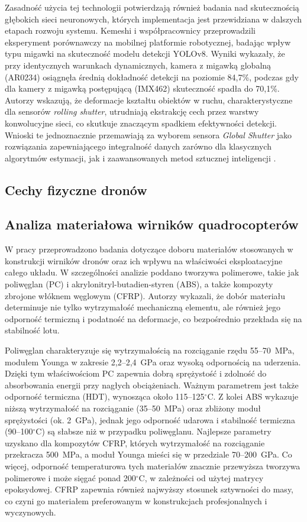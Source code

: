 \documentclass[a4paper,twoside,12pt]{book}
\begin{document}
Zasadność użycia tej technologii potwierdzają również badania nad skutecznością głębokich sieci neuronowych, których implementacja jest przewidziana w dalszych etapach rozwoju systemu. Kemeshi i współpracownicy przeprowadzili eksperyment porównawczy na mobilnej platformie robotycznej, badając wpływ typu migawki na skuteczność modelu detekcji YOLOv8. Wyniki wykazały, że przy identycznych warunkach dynamicznych, kamera z migawką globalną (AR0234) osiągnęła średnią dokładność detekcji na poziomie 84,7\%, podczas gdy dla kamery z migawką postępującą (IMX462) skuteczność spadła do 70,1\%. Autorzy wskazują, że deformacje kształtu obiektów w ruchu, charakterystyczne dla sensorów \textit{rolling shutter}, utrudniają ekstrakcję cech przez warstwy konwolucyjne sieci, co skutkuje znaczącym spadkiem efektywności detekcji. Wnioski te jednoznacznie przemawiają za wyborem sensora \textit{Global Shutter} jako rozwiązania zapewniającego integralność danych zarówno dla klasycznych algorytmów estymacji, jak i zaawansowanych metod sztucznej inteligencji \cite{bib:Kemeshi2024}.

\subsection{Cechy fizyczne dronów}
\subsection*{Analiza materiałowa wirników quadrocopterów}

W pracy \cite{bib:tiruvenkadam2024} przeprowadzono badania dotyczące doboru materiałów stosowanych w konstrukcji wirników dronów oraz ich wpływu na właściwości eksploatacyjne całego układu. W szczególności analizie poddano tworzywa polimerowe, takie jak poliwęglan (PC) i akrylonitryl-butadien-styren (ABS), a także kompozyty zbrojone włóknem węglowym (CFRP). Autorzy wykazali, że dobór materiału determinuje nie tylko wytrzymałość mechaniczną elementu, ale również jego odporność termiczną i podatność na deformacje, co bezpośrednio przekłada się na stabilność lotu.

Poliwęglan charakteryzuje się wytrzymałością na rozciąganie rzędu 55--70~MPa, modułem Younga w zakresie 2,2--2,4~GPa oraz wysoką odpornością na uderzenia. Dzięki tym właściwościom PC zapewnia dobrą sprężystość i zdolność do absorbowania energii przy nagłych obciążeniach. Ważnym parametrem jest także odporność termiczna (HDT), wynosząca około 115--125$^\circ$C. Z kolei ABS wykazuje niższą wytrzymałość na rozciąganie (35--50~MPa) oraz zbliżony moduł sprężystości (ok. 2~GPa), jednak jego odporność udarowa i stabilność termiczna (90--100$^\circ$C) są słabsze niż w przypadku poliwęglanu. Najlepsze parametry uzyskano dla kompozytów CFRP, których wytrzymałość na rozciąganie przekracza 500~MPa, a moduł Younga mieści się w przedziale 70--200~GPa. Co więcej, odporność temperaturowa tych materiałów znacznie przewyższa tworzywa polimerowe i może sięgać ponad 200$^\circ$C, w zależności od użytej matrycy epoksydowej. CFRP zapewnia również najwyższy stosunek sztywności do masy, co czyni go materiałem preferowanym w konstrukcjach profesjonalnych i wyczynowych.
\end{document}
